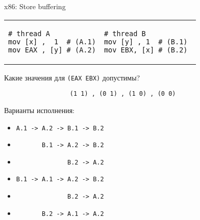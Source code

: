 \begin{frame}{x86: Store buffering}

\begin{tabular}{p{} p{}}
\begin{verbatim}
# thread A
mov [x] ,  1  # (A.1)
mov EAX , [y] # (A.2)
\end{verbatim}

& 

\begin{verbatim}
# thread B          
mov [y] , 1  # (B.1) 
mov EBX, [x] # (B.2) 
\end{verbatim}
\end{tabular}

\pause
Какие значения для \texttt{(EAX EBX)} допустимы?

\texttt{\ \ \ \ \ \ \ \ \ \ \ \ \ \ \ \ \ \ (1 1)\ , (0 1)\ , (1 0)\ , (0 0)}

\pause
Варианты исполнения:
\begin{itemize}
    \item \texttt{A.1 -> A.2 -> B.1 -> B.2}
    \item \texttt{\ \ \ \ \ \ \       B.1 -> A.2 -> B.2}
    \item \texttt{\ \ \ \ \ \ \ \ \ \ \ \ \ \              B.2 -> A.2}
    \item \texttt{B.1 -> A.1 -> A.2 -> B.2}
    \item \texttt{\ \ \ \ \ \ \ \ \ \ \ \ \ \              B.2 -> A.2}
    \item \texttt{\ \ \ \ \ \ \       B.2 -> A.1 -> A.2}
\end{itemize}
\end{frame}

